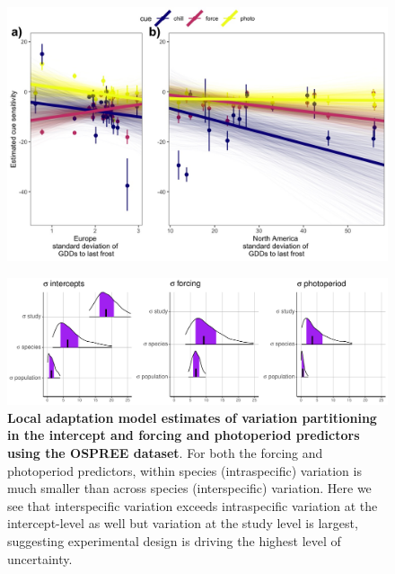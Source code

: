 \documentclass[12pt]{article}
\begin{document}
\begin{figure}[h!]
    \centering
 \includegraphics[width=\textwidth]{..//..//analyses/ranges/figures/mock1.jpeg} 
    \caption{ }
    \label{fig:mods2}
\end{figure}

\begin{figure}[h!]
    \centering
 \includegraphics[width=\textwidth]{..//..//analyses/ranges/figures/variancepartitioning.pdf} 
    \caption{ \textbf{Local adaptation model estimates of variation partitioning in the intercept and forcing and photoperiod predictors using the OSPREE dataset}. For both the forcing and photoperiod predictors, within species (intraspecific) variation is much smaller than across species (interspecific) variation. Here we see that interspecific variation exceeds intraspecific variation at the intercept-level as well but variation at the study level is largest, suggesting experimental design is driving the highest level of uncertainty.}
    \label{fig:popy}
\end{figure}
\end{document}
